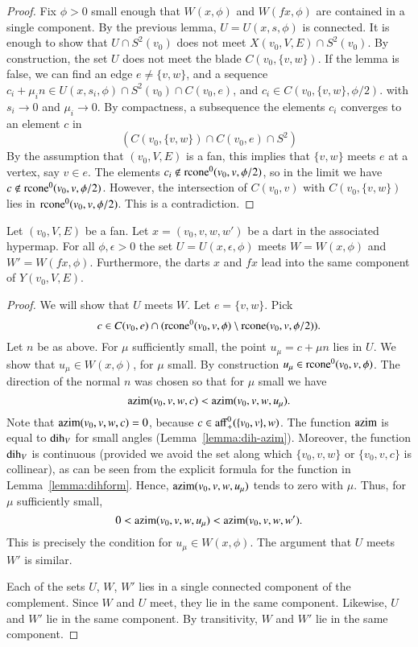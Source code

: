 \begin{proof}  Fix $\phi>0$ small enough that $W(x,\phi)$
and $W(f x,\phi)$ are contained in a single component.
By the previous lemma, $U=U(x,s,\phi)$ 
is connected.  It is enough to
show that $U\cap S^2(v_0)$  does not meet $X(v_0,V,E) \cap S^2(v_0)$.
By construction, the set $U$ does not meet the blade
$C(v_0,\{v,w\})$.  If the lemma is false, we can find an
edge $e\ne \{v,w\}$,
and
a sequence $c_i + \mu_i n \in U(x,s_i,\phi)\cap S^2(v_0)
\cap C(v_0,e)$, and $c_i\in C(v_0,\{v,w\},\phi/2)$. 
with $s_i \to 0$ and $\mu_i\to 0$. 
By compactness, a subsequence
the elements $c_i$ converges to an
element $c$ in 
  $$(C(v_0,\{v,w\})\cap C(v_0,e)\cap S^2)
  $$
By the assumption that  $(v_0,V,E)$ is a fan, this
implies that $\{v,w\}$ meets $e$ at a vertex, say $v\in e$.
The elements $c_i\not\in {\operatorname{rcone}}^0(v_0,v,\phi/2)$, so
in the limit we have $c\not\in{\operatorname{rcone}}^0(v_0,v,\phi/2)$.
However, the intersection of $C(v_0,v)$ with $C(v_0,\{v,w\})$
lies in ${\operatorname{rcone}}^0(v_0,v,\phi/2)$.  This is a contradiction.
\end{proof}

\begin{lemma}
Let $(v_0,V,E)$ be a fan.
Let $x=(v_0,v,w,w')$ be a dart in the associated hypermap.
For all $\phi,\epsilon > 0$
the set $U=U(x,\epsilon,\phi)$ meets $W=W(x,\phi)$ and 
$W'=W(f x,\phi)$.
Furthermore, the darts $x$ and $f x$ lead into the same
component of $Y(v_0,V,E)$.
\end{lemma}

\begin{proof}
We will show that $U$ meets $W$.    Let $e=\{v,w\}$. Pick 
 $$c\in C(v_0,e) \cap 
      ({\operatorname{rcone}}^0(v_0,v,\phi)\setminus {\operatorname{rcone}}(v_0,v,\phi/2)).
 $$
Let $n$ be as above.  For $\mu$ sufficiently small, the point
$u_\mu=c + \mu n$ lies in  $U$.  We show that $u_\mu\in W(x,\phi)$, for $\mu$ small.
By construction $u_\mu\in {\operatorname{rcone}}^0(v_0,v,\phi)$.
The direction of the normal $n$ was chosen so that for $\mu$ small
we have
   $$
   {\operatorname{azim}}(v_0,v,w,c) < {\operatorname{azim}}(v_0,v,w,u_\mu).
   $$
Note that ${\operatorname{azim}}(v_0,v,w,c) = 0$, because 
$c\in{\operatorname{aff}}_+^0(\{v_0,v\},w)$. 
The function ${\operatorname{azim}}$ is equal to ${\operatorname{dih}}_V$ for
small angles (Lemma~\ref{lemma:dih-azim}).  Moreover,
the function $\operatorname{dih}_V$ is continuous (provided
we avoid the set along which $\{v_0,v,w\}$ or $\{v_0,v,c\}$ is
collinear), as can be seen
from the explicit formula 
for the function in Lemma~\ref{lemma:dihform}.
Hence, ${\operatorname{azim}}(v_0,v,w,u_\mu)$ tends to zero with $\mu$.
Thus, for $\mu$ sufficiently small,
   $$
   0 < {\operatorname{azim}}(v_0,v,w,u_\mu) < {\operatorname{azim}}(v_0,v,w,w').
   $$
This is precisely the condition for $u_\mu\in W(x,\phi)$.
The argument that $U$ meets
$W'$ is similar.

Each of the sets $U$, $W$, $W'$ lies in a single connected
component of the complement.  Since $W$ and $U$ meet, they
lie in the same component.  Likewise, $U$ and $W'$ lie in the
same component.  By transitivity, $W$ and $W'$ lie in the same
component.
\end{proof}

